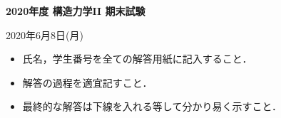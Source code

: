 \documentclass[10pt,a4j]{jarticle}
\newlength{\minitwocolumn}
\begin{document}
\newcommand{\fat}[1]{\mbox{\boldmath $#1$}}
\newcommand{\D}{\partial}
\newcommand{\w}{\omega}
\newcommand{\ga}{\alpha}
\newcommand{\gb}{\beta}
\newcommand{\gx}{\xi}
\newcommand{\gz}{\zeta}
\newcommand{\vhat}[1]{\hat{\fat{#1}}}
\newcommand{\spc}{\vspace{0.7\baselineskip}}
\newcommand{\halfspc}{\vspace{0.3\baselineskip}}

\newcommand{\twofig}[2]
 {
   \begin{figure}[h]
     \begin{minipage}[t]{\minitwocolumn}
         \begin{center}   #1
         \end{center}
     \end{minipage}
         \hspace{\columnsep}
     \begin{minipage}[t]{\minitwocolumn}
         \begin{center} #2
         \end{center}
     \end{minipage}
   \end{figure}
 }
\begin{center}
{\Large \bf 2020年度 構造力学II 期末試験} \\
\end{center}
\begin{flushright}
	2020年6月8日(月)
\end{flushright}
\begin{itemize}
\item
	氏名，学生番号を全ての解答用紙に記入すること．
\item
	解答の過程を適宜記すこと．
\item
	最終的な解答は下線を入れる等して分かり易く示すこと．
\end{itemize}
\end{document}
